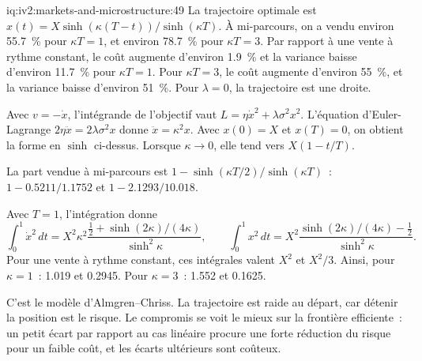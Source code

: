 \begin{solution}{iq:iv2:markets-and-microstructure:49}
La trajectoire optimale est $x(t) = X\sinh(\kappa(T - t))/\sinh(\kappa T)$. À mi-parcours, on a vendu environ 55.7~\% pour $\kappa T = 1$, et environ 78.7~\% pour $\kappa T = 3$. Par rapport à une vente à rythme constant, le coût augmente d'environ 1.9~\% et la variance baisse d'environ 11.7~\% pour $\kappa T = 1$. Pour $\kappa T = 3$, le coût augmente d'environ 55~\%, et la variance baisse d'environ 51~\%. Pour $\lambda = 0$, la trajectoire est une droite.

Avec $v = -\dot x$, l'intégrande de l'objectif vaut $L = \eta\dot x^2 + \lambda\sigma^2x^2$. L'équation d'Euler-Lagrange $2\eta\ddot x = 2\lambda\sigma^2 x$ donne $\ddot x = \kappa^2x$. Avec $x(0) = X$ et $x(T) = 0$, on obtient la forme en $\sinh$ ci-dessus. Lorsque $\kappa \to 0$, elle tend vers $X(1 - t/T)$.

La part vendue à mi-parcours est $1 - \sinh(\kappa T/2)/\sinh(\kappa T)$~: $1 - 0.5211/1.1752$ et $1 - 2.1293/10.018$.

Avec $T = 1$, l'intégration donne
\[
\int_0^1\dot x^2\,dt = X^2\kappa^2\frac{\tfrac12 + \sinh(2\kappa)/(4\kappa)}{\sinh^2\kappa},\qquad
\int_0^1 x^2\,dt = X^2\frac{\sinh(2\kappa)/(4\kappa) - \tfrac12}{\sinh^2\kappa}.
\]
Pour une vente à rythme constant, ces intégrales valent $X^2$ et $X^2/3$. Ainsi, pour $\kappa = 1$~: 1.019 et 0.2945. Pour $\kappa = 3$~: 1.552 et 0.1625.

C'est le modèle d'Almgren--Chriss. La trajectoire est raide au départ, car détenir la position est le risque. Le compromis se voit le mieux sur la frontière efficiente~: un petit écart par rapport au cas linéaire procure une forte réduction du risque pour un faible coût, et les écarts ultérieurs sont coûteux.

\end{solution}

